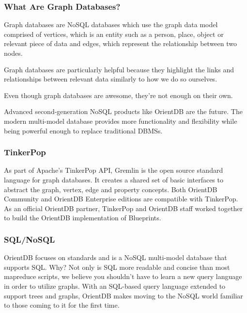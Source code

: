 \documentclass[
	final,
	a4paper,
	oneside,
	parskip=half,
	headings=standardclasses,
	headings=big,
	pointednumbers,
    fleqn
]{scrartcl}
\begin{document}
\begin{multicols*}{2}
            \subsubsection{What Are Graph Databases?}

                Graph databases are NoSQL databases which use the graph data model comprised of vertices, which is an entity such as a person, place, object or relevant piece of data and edges, which represent the relationship between two nodes.
                
                Graph databases are particularly helpful because they highlight the links and relationships between relevant data similarly to how we do so ourselves.
                
                Even though graph databases are awesome, they’re not enough on their own.
                
                Advanced second-generation NoSQL products like OrientDB are the future. The modern multi-model database provides more functionality and flexibility while being powerful enough to replace traditional DBMSs.

            \subsubsection{TinkerPop}

                As part of Apache’s TinkerPop API, Gremlin is the open source standard language for graph databases. It creates a shared set of basic interfaces to abstract the graph, vertex, edge and property concepts.
                Both OrientDB Community and OrientDB Enterprise editions are compatible with TinkerPop.
                As an official OrientDB partner, TinkerPop and OrientDB staff worked together to build the OrientDB implementation of Blueprints.

            \subsubsection{SQL/NoSQL}

                OrientDB focuses on standards and is a NoSQL multi-model database that supports SQL. Why?
                Not only is SQL more readable and concise than most mapreduce scripts, we believe you shouldn’t have to learn a new query language in order to utilize graphs.
                With an SQL-based query language extended to support trees and graphs, OrientDB makes moving to the NoSQL world familiar to those coming to it for the first time.


\end{multicols*}
\end{document}

